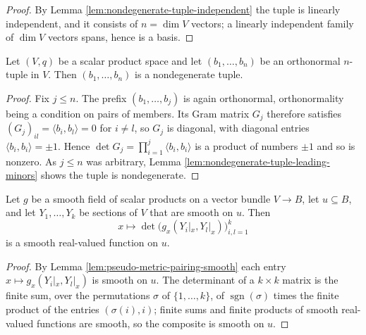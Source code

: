 \begin{proof}
\leanok
{}
By Lemma \ref{lem:nondegenerate-tuple-independent} the tuple is linearly independent, and it consists of $n = \dim V$ vectors; a linearly independent family of $\dim V$ vectors spans, hence is a basis.
\end{proof}

\begin{lemma}
\label{lem:orthonormal-tuple-nondegenerate}
\leanok
{}
Let $(V,q)$ be a scalar product space and let $(b_1,\ldots,b_n)$ be an orthonormal $n$-tuple in $V$. Then $(b_1,\ldots,b_n)$ is a nondegenerate tuple.
\end{lemma}

\begin{proof}
\leanok
{}
Fix $j \leq n$. The prefix $(b_1,\ldots,b_j)$ is again orthonormal, orthonormality being a condition on pairs of members. Its Gram matrix $G_j$ therefore satisfies $(G_j)_{il} = \langle b_i, b_l \rangle = 0$ for $i \neq l$, so $G_j$ is diagonal, with diagonal entries $\langle b_i,b_i\rangle = \pm 1$. Hence $\det G_j = \prod_{i=1}^{j} \langle b_i, b_i \rangle$ is a product of numbers $\pm 1$ and so is nonzero. As $j \leq n$ was arbitrary, Lemma \ref{lem:nondegenerate-tuple-leading-minors} shows the tuple is nondegenerate.
\end{proof}

\begin{lemma}
\label{lem:gram-det-smooth}
\leanok
{}
Let $g$ be a smooth field of scalar products on a vector bundle $V \to B$, let $u \subseteq B$, and let $Y_1,\ldots,Y_k$ be sections of $V$ that are smooth on $u$. Then
\[
x \longmapsto \det \bigl(g_x(Y_i|_x, Y_l|_x)\bigr)_{i,l=1}^{k}
\]
is a smooth real-valued function on $u$.
\end{lemma}

\begin{proof}
\leanok
{}
By Lemma \ref{lem:pseudo-metric-pairing-smooth} each entry $x \mapsto g_x(Y_i|_x, Y_l|_x)$ is smooth on $u$. The determinant of a $k \times k$ matrix is the finite sum, over the permutations $\sigma$ of $\{1,\ldots,k\}$, of $\operatorname{sgn}(\sigma)$ times the finite product of the entries $(\sigma(i), i)$; finite sums and finite products of smooth real-valued functions are smooth, so the composite is smooth on $u$.
\end{proof}


